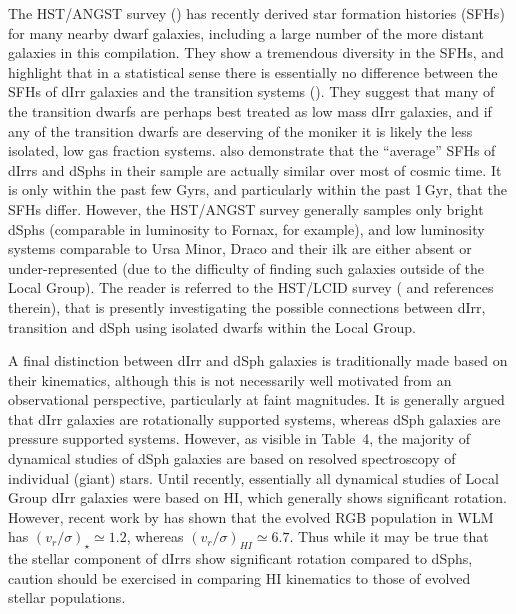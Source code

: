 \documentclass[manuscript]{aastex}
\begin{document}
The HST/ANGST survey (\citealt{dalcanton2009}) has recently derived
star formation histories (SFHs) for many nearby dwarf galaxies,
including a large number of the more distant galaxies in this compilation. They show a
tremendous diversity in the SFHs, and highlight that in a statistical
sense there is essentially no difference between the SFHs of dIrr
galaxies and the transition systems (\citealt{weisz2011}). They
suggest that many of the transition dwarfs are perhaps best treated as
low mass dIrr galaxies, and if any of the transition dwarfs are
deserving of the moniker it is likely the less isolated, low gas
fraction systems. \cite{weisz2011} also demonstrate that the
``average'' SFHs of dIrrs and dSphs in their sample are actually
similar over most of cosmic time. It is only within the past few Gyrs,
and particularly within the past 1\,Gyr, that the SFHs
differ. However, the HST/ANGST survey generally samples only bright
dSphs (comparable in luminosity to Fornax, for example), and low
luminosity systems comparable to Ursa Minor, Draco and their ilk are
either absent or under-represented (due to the difficulty of finding
such galaxies outside of the Local Group). The reader is referred to
the HST/LCID survey (\citealt{monelli2010a,monelli2010b,hidalgo2011}
and references therein), that is presently investigating the possible
connections between dIrr, transition and dSph using isolated dwarfs
within the Local Group.

A final distinction between dIrr and dSph galaxies is traditionally
made based on their kinematics, although this is not necessarily well
motivated from an observational perspective, particularly at faint
magnitudes. It is generally argued that dIrr galaxies are rotationally
supported systems, whereas dSph galaxies are pressure supported
systems. However, as visible in Table~4, the majority of dynamical
studies of dSph galaxies are based on resolved spectroscopy of
individual (giant) stars. Until recently, essentially all dynamical
studies of Local Group dIrr galaxies were based on HI, which generally
shows significant rotation. However, recent work by \cite{leaman2009}
has shown that the evolved RGB population in WLM has
$(v_r/\sigma)_\star \simeq 1.2$, whereas $(v_r/\sigma)_{HI} \simeq
6.7$. Thus while it may be true that the stellar component of dIrrs
show significant rotation compared to dSphs, caution should be
exercised in comparing HI kinematics to those of evolved stellar
populations.
\end{document}
